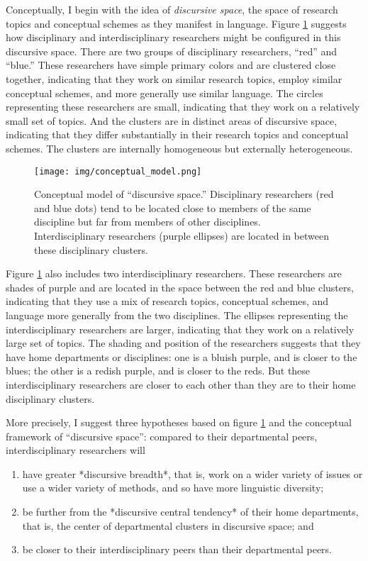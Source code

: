 \documentclass[
  11pt,
]{article}
\begin{document}
Conceptually, I begin with the idea of \emph{discursive space}, the space of research topics and conceptual schemes as they manifest in language. Figure \ref{fig.conceptual} suggests how disciplinary and interdisciplinary researchers might be configured in this discursive space. There are two groups of disciplinary researchers, ``red'' and ``blue.'' These researchers have simple primary colors and are clustered close together, indicating that they work on similar research topics, employ similar conceptual schemes, and more generally use similar language. The circles representing these researchers are small, indicating that they work on a relatively small set of topics. And the clusters are in distinct areas of discursive space, indicating that they differ substantially in their research topics and conceptual schemes. The clusters are internally homogeneous but externally heterogeneous.

\begin{figure}
\centering
\texttt{[image: img/conceptual\_model.png]}
\caption{Conceptual model of ``discursive space.'' Disciplinary researchers (red and blue dots) tend to be located close to members of the same discipline but far from members of other disciplines. Interdisciplinary researchers (purple ellipses) are located in between these disciplinary clusters. \label{fig.conceptual}}
\end{figure}

Figure \ref{fig.conceptual} also includes two interdisciplinary researchers. These researchers are shades of purple and are located in the space between the red and blue clusters, indicating that they use a mix of research topics, conceptual schemes, and language more generally from the two disciplines. The ellipses representing the interdisciplinary researchers are larger, indicating that they work on a relatively large set of topics. The shading and position of the researchers suggests that they have home departments or disciplines: one is a bluish purple, and is closer to the blues; the other is a redish purple, and is closer to the reds. But these interdisciplinary researchers are closer to each other than they are to their home disciplinary clusters.

More precisely, I suggest three hypotheses based on figure \ref{fig.conceptual} and the conceptual framework of ``discursive space'': compared to their departmental peers, interdisciplinary researchers will

\begin{enumerate}[label = H\arabic*., ref = H\arabic*]
\item have greater *discursive breadth*, that is, work on a wider variety of issues or use a wider variety of methods, and so have more linguistic diversity; \label{h1}
\item be further from the *discursive central tendency* of their home departments, that is, the center of departmental clusters in discursive space; and \label{h2}
\item be closer to their interdisciplinary peers than their departmental peers.  \label{h3}
\end{enumerate}
\end{document}
